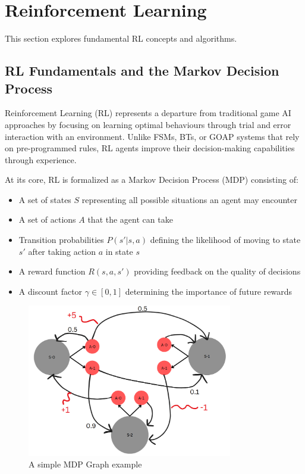 \section{Reinforcement Learning}

This section explores fundamental RL concepts and algorithms.

\subsection{RL Fundamentals and the Markov Decision Process}

Reinforcement Learning (RL) represents a departure from traditional game AI approaches by focusing on learning optimal behaviours through trial and error interaction with an environment. 
Unlike FSMs, BTs, or GOAP systems that rely on pre-programmed rules, RL agents improve their decision-making capabilities through experience.

At its core, RL is formalized as a Markov Decision Process (MDP) consisting of:
\begin{itemize}
    \item A set of states $S$ representing all possible situations an agent may encounter
    \item A set of actions $A$ that the agent can take
    \item Transition probabilities $P(s'|s,a)$ defining the likelihood of moving to state $s'$ after taking action $a$ in state $s$
    \item A reward function $R(s,a,s')$ providing feedback on the quality of decisions
    \item A discount factor $\gamma \in [0,1]$ determining the importance of future rewards
\end{itemize}

\begin{figure}[H]
    \centering
    \includegraphics[width=0.8\textwidth]{figures/mdp_framework.png}
    \caption{A simple MDP Graph example}
    \label{fig:mdp-framework}
\end{figure}

